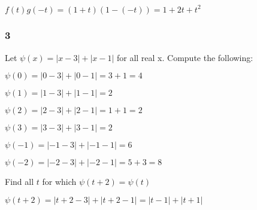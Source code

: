 \documentclass{report}
\begin{document}
$f(t)g(-t) = (1 + t)(1 - (-t)) = 1 + 2t + t^2$

\subsubsection{3}

Let $\psi(x) = |x - 3| + |x -1|$ for all real x. Compute the following:

$\psi(0) = |0 - 3| + |0 - 1| = 3 + 1 = 4$

$\psi(1) = |1 - 3| + |1 - 1| = 2$

$\psi(2) = |2 - 3| + |2 - 1| = 1 + 1 = 2$

$\psi(3) = |3 - 3| + |3 - 1| = 2$

$\psi(-1) = |-1 - 3| + |-1 - 1| = 6$

$\psi(-2) = |-2 - 3| + |-2 - 1| = 5 + 3 = 8$

Find all $t$ for which $\psi(t + 2) = \psi(t)$

$\psi(t+2) = |t + 2 - 3| + |t + 2 - 1| = |t - 1| + |t + 1| $
\end{document}
